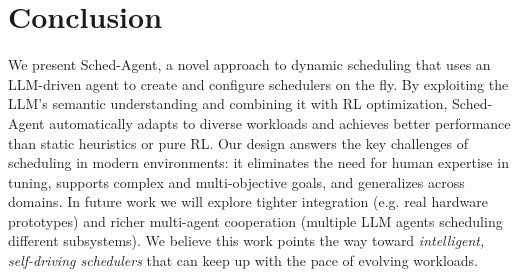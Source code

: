 \section{Conclusion}

We present Sched-Agent, a novel approach to dynamic scheduling that uses an LLM-driven agent to create and configure schedulers on the fly. By exploiting the LLM's semantic understanding and combining it with RL optimization, Sched-Agent automatically adapts to diverse workloads and achieves better performance than static heuristics or pure RL. Our design answers the key challenges of scheduling in modern environments: it eliminates the need for human expertise in tuning, supports complex and multi-objective goals, and generalizes across domains. In future work we will explore tighter integration (e.g. real hardware prototypes) and richer multi-agent cooperation (multiple LLM agents scheduling different subsystems). We believe this work points the way toward \emph{intelligent, self-driving schedulers} that can keep up with the pace of evolving workloads.